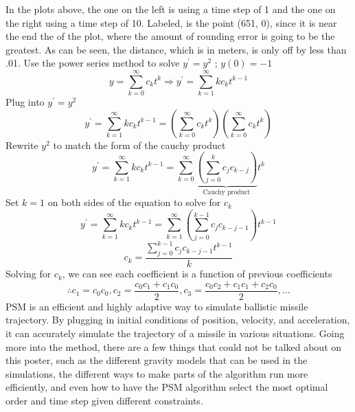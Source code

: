 \documentclass[25pt, a0paper, portrait]{tikzposter}
\begin{document}
\begin{columns}
{        In the plots above, the one on the left is using a time step of 1 and the one on the right
        using a time step of 10.  Labeled, is the point (651, 0), since it is near the end the of
        the plot, where the amount of rounding error is going to be the greatest.  As can be seen, 
        the distance, which is in meters, is only off by less than .01.
    }
    {
        Use the power series method to solve $y^\prime = y^2$ ; $y(0) = -1$
        \begin{equation*}
            y = \sum\limits_{k=0}^{\infty}c_kt^k \Rightarrow y^\prime = \sum\limits_{k=1}^{\infty}kc_kt^{k-1}
        \end{equation*}
        Plug into $y^\prime = y^2$
        \begin{equation*}
            y^\prime = \sum\limits_{k=1}^{\infty}kc_kt^{k-1} = \left(\sum\limits_{k=0}^{\infty}c_kt^k\right) \left(\sum\limits_{k=0}^{\infty}c_kt^k\right)
        \end{equation*}
        Rewrite $y^2$ to match the form of the cauchy product
        \begin{equation}
            y^\prime = \sum\limits_{k=1}^{\infty}kc_kt^{k-1} = \sum\limits_{k=0}^{\infty} \underbrace{\left(\sum\limits_{j=0}^{k}c_jc_{k-j}\right)}_{\text{Cauchy product}}t^k
        \end{equation}
        Set $k = 1$ on both sides of the equation to solve for $c_k$
        \begin{equation*}
            y^\prime = \sum\limits_{k=1}^{\infty}kc_kt^{k-1} = \sum\limits_{k=1}^{\infty} \left(\sum\limits_{j=0}^{k-1}c_jc_{k-j-1}\right)t^{k-1}
        \end{equation*}
        \begin{equation}
            c_k = \frac{\sum\limits_{j=0}^{k-1}c_jc_{k-j-1}t^{k-1}}{k}
        \end{equation}
        Solving for $c_k$, we can see each coefficient is a function of previous coefficients
        \begin{equation*}
            \therefore c_1 = c_0c_0, c_2 = \frac{c_0c_1 + c_1c_0}{2}, c_3 = \frac{c_0c_2 + c_1c_1+ c_2c_0}{2},\dots
        \end{equation*}
    }
    {
        PSM is an efficient and highly adaptive way to simulate ballistic missile trajectory.  By 
        plugging in initial conditions of position, velocity, and acceleration, it can accurately 
        simulate the trajectory of a missile in various situations.  Going more into the method, 
        there are a few things that could not be talked about on this poster, such as the different 
        gravity models that can be used in the simulations, the different ways to make parts of the 
        algorithm run more efficiently, and even how to have the PSM algorithm select the most 
        optimal order and time step given different constraints.  
    }
\end{columns}
\end{document}
